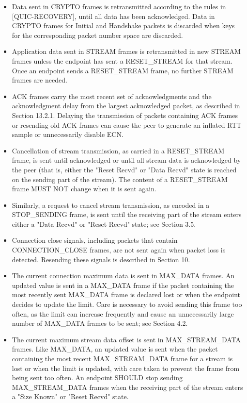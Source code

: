 \documentclass{article}
\begin{document}
\begin{itemize}
\item Data sent in CRYPTO frames is retransmitted according to the rules in [QUIC-RECOVERY], until all data has been acknowledged.  Data in CRYPTO frames for Initial and Handshake packets is discarded when keys for the corresponding packet number space are discarded.
\item Application data sent in STREAM frames is retransmitted in new STREAM frames unless the endpoint has sent a RESET\_STREAM for that stream.  Once an endpoint sends a RESET\_STREAM frame, no further STREAM frames are needed.
\item ACK frames carry the most recent set of acknowledgments and the acknowledgment delay from the largest acknowledged packet, as described in Section 13.2.1.  Delaying the transmission of packets containing ACK frames or resending old ACK frames can cause the peer to generate an inflated RTT sample or unnecessarily disable ECN.
\item Cancellation of stream transmission, as carried in a RESET\_STREAM frame, is sent until acknowledged or until all stream data is acknowledged by the peer (that is, either the "Reset Recvd" or "Data Recvd" state is reached on the sending part of the stream). The content of a RESET\_STREAM frame MUST NOT change when it is sent again.
\item Similarly, a request to cancel stream transmission, as encoded in a STOP\_SENDING frame, is sent until the receiving part of the stream enters either a "Data Recvd" or "Reset Recvd" state; see Section 3.5.
\item Connection close signals, including packets that contain CONNECTION\_CLOSE frames, are not sent again when packet loss is detected.  Resending these signals is described in Section 10.
\item The current connection maximum data is sent in MAX\_DATA frames. An updated value is sent in a MAX\_DATA frame if the packet containing the most recently sent MAX\_DATA frame is declared lost or when the endpoint decides to update the limit.  Care is necessary to avoid sending this frame too often, as the limit can increase frequently and cause an unnecessarily large number of MAX\_DATA frames to be sent; see Section 4.2.
\item The current maximum stream data offset is sent in MAX\_STREAM\_DATA frames.  Like MAX\_DATA, an updated value is sent when the packet containing the most recent MAX\_STREAM\_DATA frame for a stream is lost or when the limit is updated, with care taken to prevent the frame from being sent too often.  An endpoint SHOULD stop sending MAX\_STREAM\_DATA frames when the receiving part of the stream enters a "Size Known" or "Reset Recvd" state.

\end{itemize}
\end{document}
